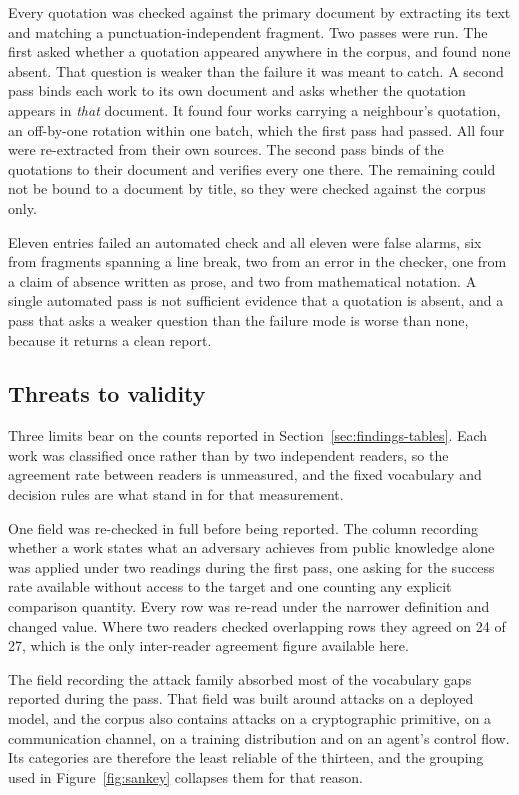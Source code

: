 Every quotation was checked against the primary document by extracting its text
and matching a punctuation-independent fragment. Two passes were run. The first
asked whether a quotation appeared anywhere in the corpus, and found none absent.
That question is weaker than the failure it was meant to catch. A second pass binds
each work to its own document and asks whether the quotation appears in \emph{that}
document. It found four works carrying a neighbour's quotation, an off-by-one
rotation within one batch, which the first pass had passed. All four were
re-extracted from their own sources. The second pass binds \QuoteBound{} of the
\QuoteOnFile{} quotations to their document and verifies every one there. The
remaining \QuoteUnbound{} could not be bound to a document by title, so they were
checked against the corpus only.

Eleven entries failed an automated check and all eleven were false alarms, six from
fragments spanning a line break, two from an error in the checker, one from a claim
of absence written as prose, and two from mathematical notation. A single automated
pass is not sufficient evidence that a quotation is absent, and a pass that asks a
weaker question than the failure mode is worse than none, because it returns a clean
report.

\subsection{Threats to validity}

Three limits bear on the counts reported in
Section~\ref{sec:findings-tables}. Each work was classified once rather than by two
independent readers, so the agreement rate between readers is unmeasured, and the
fixed vocabulary and decision rules are what stand in for that measurement.

One field was re-checked in full before being reported. The column recording
whether a work states what an adversary achieves from public knowledge alone was
applied under two readings during the first pass, one asking for the success rate
available without access to the target and one counting any explicit comparison
quantity. Every row was re-read under the narrower definition and
\BaselineChanged{} changed value. Where two readers checked overlapping rows they
agreed on 24 of 27, which is the only inter-reader agreement figure available here.

The field recording the attack family absorbed most of the vocabulary gaps reported
during the pass. That field was built around attacks on a deployed model, and the
corpus also contains attacks on a cryptographic primitive, on a communication
channel, on a training distribution and on an agent's control flow. Its categories
are therefore the least reliable of the thirteen, and the grouping used in
Figure~\ref{fig:sankey} collapses them for that reason.
